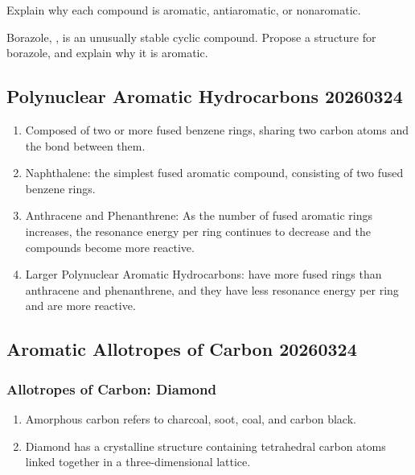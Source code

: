 \begin{example} %
    Explain why each compound is aromatic, antiaromatic, or nonaromatic.
\end{example}

\begin{example} %
    Borazole, , is an unusually stable cyclic compound. Propose a structure for borazole, and explain why it is aromatic.
\end{example}


\subsection{Polynuclear Aromatic Hydrocarbons 20260324}

\begin{enumerate}
    \item Composed of two or more fused benzene rings, sharing two carbon atoms and the bond between them.
    \item Naphthalene: the simplest fused aromatic compound, consisting of two fused benzene rings.
    \item Anthracene and Phenanthrene: As the number of fused aromatic rings increases, the resonance energy per ring continues to decrease and the compounds become more reactive.
    \item Larger Polynuclear Aromatic Hydrocarbons: have more fused rings than anthracene and phenanthrene, and they have less resonance energy per ring and are more reactive.
\end{enumerate}

\subsection{Aromatic Allotropes of Carbon 20260324}

\subsubsection{Allotropes of Carbon: Diamond}

\begin{enumerate}
    \item Amorphous carbon refers to charcoal, soot, coal, and carbon black.
    \item Diamond has a crystalline structure containing tetrahedral carbon atoms linked together in a three-dimensional lattice.
\end{enumerate}

